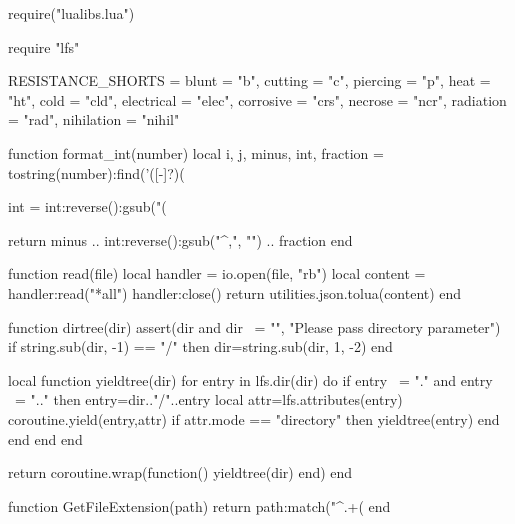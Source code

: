 \begin{luacode}
	require("lualibs.lua")

    require "lfs"

	RESISTANCE_SHORTS = {blunt = "b", cutting = "c", piercing = "p", heat = "ht", cold = "cld", electrical = "elec", corrosive = "crs", necrose = "ncr", radiation = "rad", nihilation = "nihil"}

    function format_int(number)
        local i, j, minus, int, fraction = tostring(number):find('([-]?)(%

        int = int:reverse():gsub("(%

        return minus .. int:reverse():gsub("^,", "") .. fraction
    end

	function read(file)
		local handler = io.open(file, "rb")
		local content = handler:read("*all")
		handler:close()
		return utilities.json.tolua(content)
	end

    function dirtree(dir)
        assert(dir and dir ~= "", "Please pass directory parameter")
        if string.sub(dir, -1) == "/" then
            dir=string.sub(dir, 1, -2)
        end

        local function yieldtree(dir)
            for entry in lfs.dir(dir) do
                if entry ~= "." and entry ~= ".." then
                    entry=dir.."/"..entry
                    local attr=lfs.attributes(entry)
                    coroutine.yield(entry,attr)
                    if attr.mode == "directory" then
                        yieldtree(entry)
                    end
                end
            end
        end

        return coroutine.wrap(function() yieldtree(dir) end)
    end

    function GetFileExtension(path)
        return path:match("^.+(%
    end
\end{luacode}